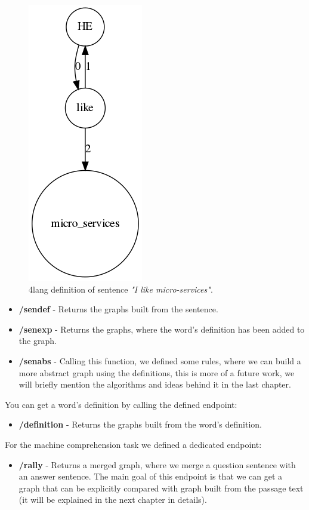 \begin{figure}[!htb]
	\centering
	\includegraphics[scale=0.4]{figures/service}
	\caption{4lang definition of sentence \textit{"I like micro-services"}.}
	\label{fig:service}
\end{figure}

\begin{itemize}
	\item \textbf{/sendef} - Returns the graphs built from the sentence.
	\item \textbf{/senexp} - Returns the graphs, where the word's definition has been added to the graph.
	\item \textbf{/senabs} - Calling this function, we defined some rules, where we can build a more abstract graph using the definitions, this is more of a future work, we will briefly mention the algorithms and ideas behind it in the last chapter.
\end{itemize}
You can get a word's definition by calling the defined endpoint:
\begin{itemize}
	\item \textbf{/definition} - Returns the graphs built from the word's definition.
\end{itemize}
For the machine comprehension task we defined a dedicated endpoint:
\begin{itemize}
	\item \textbf{/rally} - Returns a merged graph, where we merge a question sentence with an answer sentence. The main goal of this endpoint is that we can get a graph that can be explicitly compared with graph built from the passage text (it will be explained in the next chapter in details). 
\end{itemize}


